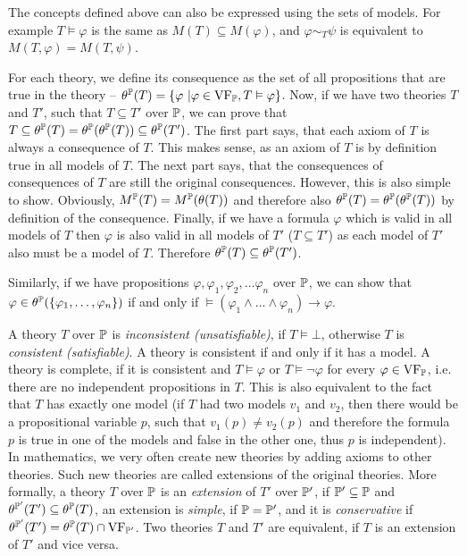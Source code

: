 The concepts defined above can also be expressed using the sets of models. For example $T \vDash \varphi$ is the same as $M(T) \subseteq M(\varphi)$, and $\varphi \sim_T \psi$ is equivalent to $M(T, \varphi) = M(T, \psi)$.

For each theory, we define its consequence as the set of all propositions that are true in the theory -- $\theta^\mathbb{P}(T) = \{\varphi\ | \varphi \in \operatorname{VF}_\mathbb{P}, T \vDash \varphi \}$. Now, if we have two theories $T$ and $T'$, such that $T \subseteq T'$ over $\mathbb{P}$, we can prove that $T \subseteq \theta^\mathbb{P}(T) = \theta^\mathbb{P}(\theta^\mathbb{P}(T)) \subseteq \theta^\mathbb{P}(T')$. The first part says, that each axiom of $T$ is always a consequence of $T$. This makes sense, as an axiom of $T$ is by definition true in all models of $T$. The next part says, that the consequences of consequences of $T$ are still the original consequences. However, this is also simple to show. Obviously, $M^\mathbb{P}(T) = M^\mathbb{P}(\theta(T))$ and therefore also $\theta^\mathbb{P}(T) = \theta^\mathbb{P}(\theta^\mathbb{P}(T))$ by definition of the consequence. Finally, if we have a formula $\varphi$ which is valid in all models of $T$ then $\varphi$ is also valid in all models of $T'$ ($T \subseteq T'$) as each model of $T'$ also must be a model of $T$. Therefore $\theta^\mathbb{P}(T) \subseteq \theta^\mathbb{P}(T')$.

Similarly, if we have propositions $\varphi, \varphi_1, \varphi_2, \dots \varphi_n$ over $\mathbb{P}$, we can show that $\varphi \in \theta^\mathbb{P}(\{\varphi_1, \dots, \varphi_n\})$ if and only if $\vDash (\varphi_1 \land \dots \land \varphi_n) \to \varphi$.

A theory $T$ over $\mathbb{P}$ is \emph{inconsistent (unsatisfiable)}, if $T \vDash \bot$, otherwise $T$ is \emph{consistent (satisfiable)}. A theory is consistent if and only if it has a model. A theory is complete, if it is consistent and $T\vDash \varphi$ or $T \vDash \neg \varphi$ for every $\varphi \in \operatorname{VF}_\mathbb{P}$, i.e. there are no independent propositions in $T$. This is also equivalent to the fact that $T$ has exactly one model (if $T$ had two models $v_1$ and $v_2$, then there would be a propositional variable $p$, such that $v_1(p) \neq v_2(p)$ and therefore the formula $p$ is true in one of the models and false in the other one, thus $p$ is independent). In mathematics, we very often create new theories by adding axioms to other theories. Such new theories are called extensions of the original theories. More formally, a theory $T$ over $\mathbb{P}$ is an \emph{extension} of $T'$ over $\mathbb{P}'$, if $\mathbb{P}' \subseteq \mathbb{P}$ and $\theta^{\mathbb{P}'}(T') \subseteq \theta^\mathbb{P}(T)$, an extension is \emph{simple}, if $\mathbb{P} = \mathbb{P}'$, and it is \emph{conservative} if $\theta^{\mathbb{P}'}(T') = \theta^\mathbb{P}(T) \cap \operatorname{VF}_{\mathbb{P}'}$. Two theories $T$ and $T'$ are equivalent, if $T$ is an extension of $T'$ and vice versa.

